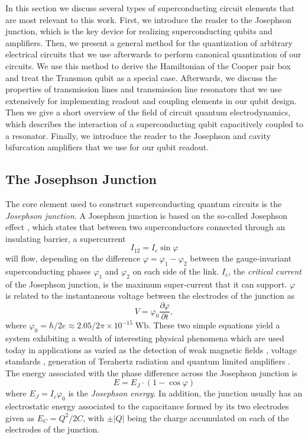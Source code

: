 In this section we discuss several types of superconducting circuit elements that are most relevant to this work. First, we introduce the reader to the Josephson junction, which is the key device for realizing superconducting qubits and amplifiers. Then, we present a general method for the quantization of arbitrary electrical circuits that we use afterwards to perform canonical quantization of our circuits. We use this method to derive the Hamiltonian of the Cooper pair box and treat the Transmon qubit as a special case. Afterwards, we discuss the properties of transmission lines and transmission line resonators that we use extensively for implementing readout and coupling elements in our qubit design. Then we give a short overview of the field of circuit quantum electrodynamics, which describes the interaction of a superconducting qubit capacitively coupled to a  resonator. Finally, we introduce the reader to the Josephson and cavity bifurcation amplifiers that we use for our qubit readout.

\subsection{The Josephson Junction}

The core element used to construct superconducting quantum circuits is the {\it Josephson junction}. A Josephson junction is based on the so-called Josephson effect \citep{josephson_possible_1962}, which states that between two superconductors connected through an insulating barrier, a supercurrent
%
\begin{equation}
I_{12} = I_c\sin{\varphi}
\end{equation}
%
will flow, depending on the difference $\varphi = \varphi_1-\varphi_2$ between the gauge-invariant superconducting phases $\varphi_1$ and $\varphi_2$ on each side of the link. $I_c$, the {\it critical current} of the Josephson junction, is the maximum super-current that it can support. $\varphi$ is related to the instantaneous voltage between the electrodes of the junction as
%
\begin{equation}
V = \varphi_0\frac{\partial \varphi}{\partial t},
\end{equation}
%
where $\varphi_0 =\hbar/2e \approx 2.05/2\pi\times 10^{-15}\;\mathrm{Wb}$. These two simple equations yield a system exhibiting a  wealth of interesting physical phenomena which are used today in applications as varied as the detection of weak magnetic fields \citep{clarke_squid_2005}, voltage standards \citep{levinsen_inverse_1977}, generation of Terahertz radiation \citep{ozyuzer_emission_2007} and quantum limited amplifiers \citep{vijay_invited_2009}. The energy associated with the phase difference across the Josephson junction is
%
\begin{equation}
E = E_J\cdot(1-\cos{\varphi})
\end{equation}
%
where $E_J = I_c\varphi_0$ is the {\it Josephson energy}. In addition, the junction usually has an electrostatic energy associated to the capacitance formed by its two electrodes given as $E_C = Q^2/2C$, with $\pm|Q|$ being the charge accumulated on each of the electrodes of the junction.

